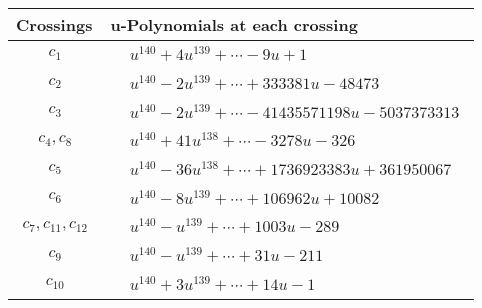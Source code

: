\documentclass[1p]{elsarticle_modified}
\theoremstyle{definition}
\begin{document}
\begin{tabular}{m{50pt}|m{274pt}}
Crossings & \hspace{64pt}u-Polynomials at each crossing \\
\hline $$\begin{aligned}c_{1}\end{aligned}$$&$\begin{aligned}
&u^{140}+4 u^{139}+\cdots-9 u+1
\end{aligned}$\\
\hline $$\begin{aligned}c_{2}\end{aligned}$$&$\begin{aligned}
&u^{140}-2 u^{139}+\cdots+333381 u-48473
\end{aligned}$\\
\hline $$\begin{aligned}c_{3}\end{aligned}$$&$\begin{aligned}
&u^{140}-2 u^{139}+\cdots-41435571198 u-5037373313
\end{aligned}$\\
\hline $$\begin{aligned}c_{4},c_{8}\end{aligned}$$&$\begin{aligned}
&u^{140}+41 u^{138}+\cdots-3278 u-326
\end{aligned}$\\
\hline $$\begin{aligned}c_{5}\end{aligned}$$&$\begin{aligned}
&u^{140}-36 u^{138}+\cdots+1736923383 u+361950067
\end{aligned}$\\
\hline $$\begin{aligned}c_{6}\end{aligned}$$&$\begin{aligned}
&u^{140}-8 u^{139}+\cdots+106962 u+10082
\end{aligned}$\\
\hline $$\begin{aligned}c_{7},c_{11},c_{12}\end{aligned}$$&$\begin{aligned}
&u^{140}- u^{139}+\cdots+1003 u-289
\end{aligned}$\\
\hline $$\begin{aligned}c_{9}\end{aligned}$$&$\begin{aligned}
&u^{140}- u^{139}+\cdots+31 u-211
\end{aligned}$\\
\hline $$\begin{aligned}c_{10}\end{aligned}$$&$\begin{aligned}
&u^{140}+3 u^{139}+\cdots+14 u-1
\end{aligned}$\\
\hline
\end{tabular}\\~\\
\end{document}

